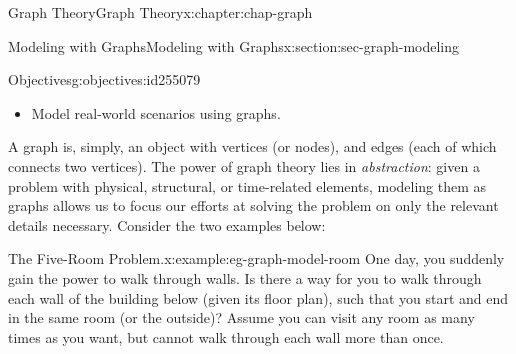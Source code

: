 \documentclass[oneside,10pt,]{book}
\numberwithin{equation}{section}
\begin{document}
\begin{chapterptx}{Graph Theory}{}{Graph Theory}{}{}{x:chapter:chap-graph}
%
%
\typeout{************************************************}
\typeout{************************************************}
%
\begin{sectionptx}{Modeling with Graphs}{}{Modeling with Graphs}{}{}{x:section:sec-graph-modeling}
\begin{objectives}{Objectives}{g:objectives:id255079}
%
\begin{itemize}[label=\textbullet]
\item{}Model real-world scenarios using graphs.%
\end{itemize}
\end{objectives}
A graph is, simply, an object with vertices (or nodes), and edges (each of which connects two vertices). The power of graph theory lies in \emph{abstraction}: given a problem with physical, structural, or time-related elements, modeling them as graphs allows us to focus our efforts at solving the problem on only the relevant details necessary. Consider the two examples below:%
\begin{example}{The Five-Room Problem.}{x:example:eg-graph-model-room}%
One day, you suddenly gain the power to walk through walls. Is there a way for you to walk through each wall of the building below (given its floor plan), such that you start and end in the same room (or the outside)? Assume you can visit any room as many times as you want, but cannot walk through each wall more than once.%
\begin{sidebyside}{1}{0.3}{0.3}{0}%
\begin{sbspanel}{0.4}%
%
\end{sbspanel}%
\end{sidebyside}%
\par

\end{example}
\end{sectionptx}
\end{chapterptx}
\end{document}
